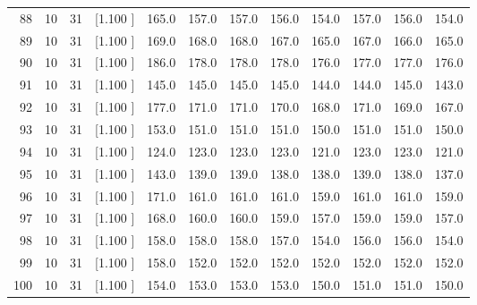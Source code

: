 \documentclass[12pt,a4paper]{article}
\begin{document}
\begin{center}
{\begin{tabular}{r r r r r r r r r r r r}
  88& 10& 31&[1.100     ]&   165.0&   157.0&   157.0&   156.0&   154.0&   157.0&   156.0&   154.0\\[-0.02in]
  89& 10& 31&[1.100     ]&   169.0&   168.0&   168.0&   167.0&   165.0&   167.0&   166.0&   165.0\\[-0.02in]
  90& 10& 31&[1.100     ]&   186.0&   178.0&   178.0&   178.0&   176.0&   177.0&   177.0&   176.0\\[-0.02in]
  91& 10& 31&[1.100     ]&   145.0&   145.0&   145.0&   145.0&   144.0&   144.0&   145.0&   143.0\\[-0.02in]
  92& 10& 31&[1.100     ]&   177.0&   171.0&   171.0&   170.0&   168.0&   171.0&   169.0&   167.0\\[-0.02in]
  93& 10& 31&[1.100     ]&   153.0&   151.0&   151.0&   151.0&   150.0&   151.0&   151.0&   150.0\\[-0.02in]
  94& 10& 31&[1.100     ]&   124.0&   123.0&   123.0&   123.0&   121.0&   123.0&   123.0&   121.0\\[-0.02in]
  95& 10& 31&[1.100     ]&   143.0&   139.0&   139.0&   138.0&   138.0&   139.0&   138.0&   137.0\\[-0.02in]
  96& 10& 31&[1.100     ]&   171.0&   161.0&   161.0&   161.0&   159.0&   161.0&   161.0&   159.0\\[-0.02in]
  97& 10& 31&[1.100     ]&   168.0&   160.0&   160.0&   159.0&   157.0&   159.0&   159.0&   157.0\\[-0.02in]
  98& 10& 31&[1.100     ]&   158.0&   158.0&   158.0&   157.0&   154.0&   156.0&   156.0&   154.0\\[-0.02in]
  99& 10& 31&[1.100     ]&   158.0&   152.0&   152.0&   152.0&   152.0&   152.0&   152.0&   152.0\\[-0.02in]
 100& 10& 31&[1.100     ]&   154.0&   153.0&   153.0&   153.0&   150.0&   151.0&   151.0&   150.0\\[-0.02in]

\hline
\end{tabular}}
\end{center}
\end{document}
